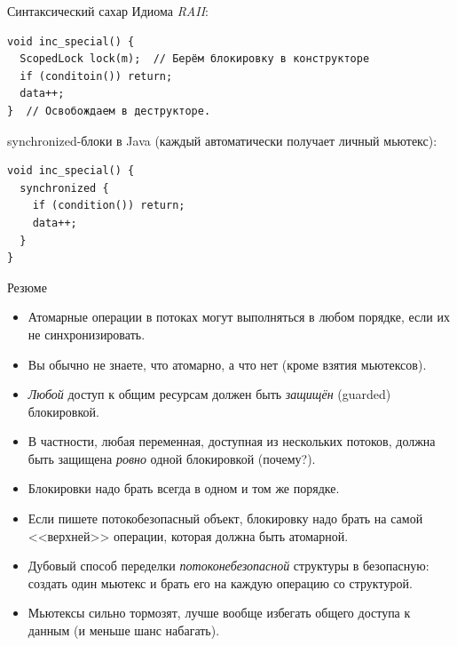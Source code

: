 \begin{frame}[fragile]{Синтаксический сахар}
	Идиома \textit{RAII}:
\begin{verbatim}
void inc_special() {
  ScopedLock lock(m);  // Берём блокировку в конструкторе
  if (conditoin()) return;
  data++;
}  // Освобождаем в деструкторе.
\end{verbatim}

	synchronized-блоки в Java (каждый автоматически получает личный мьютекс):
\begin{verbatim}
void inc_special() {
  synchronized {
    if (condition()) return;
    data++;
  }
}
\end{verbatim}
\end{frame}

\begin{frame}{Резюме}
	\begin{itemize}
		\item Атомарные операции в потоках могут выполняться в любом порядке, если их не синхронизировать.
		\item Вы обычно не знаете, что атомарно, а что нет (кроме взятия мьютексов).
		\item \textit{Любой} доступ к общим ресурсам должен быть \textit{защищён} (guarded) блокировкой.
		\item В частности, любая переменная, доступная из нескольких потоков, должна быть защищена \textit{ровно} одной блокировкой (почему?).
		\item Блокировки надо брать всегда в одном и том же порядке.
		\item Если пишете потокобезопасный объект, блокировку надо брать на самой <<верхней>> операции, которая должна быть атомарной.
		\item Дубовый способ переделки \textit{потоконебезопасной} структуры в безопасную: создать один мьютекс и брать его на каждую операцию со структурой.
		\item Мьютексы сильно тормозят, лучше вообще избегать общего доступа к данным (и меньше шанс набагать).
	\end{itemize}
\end{frame}
